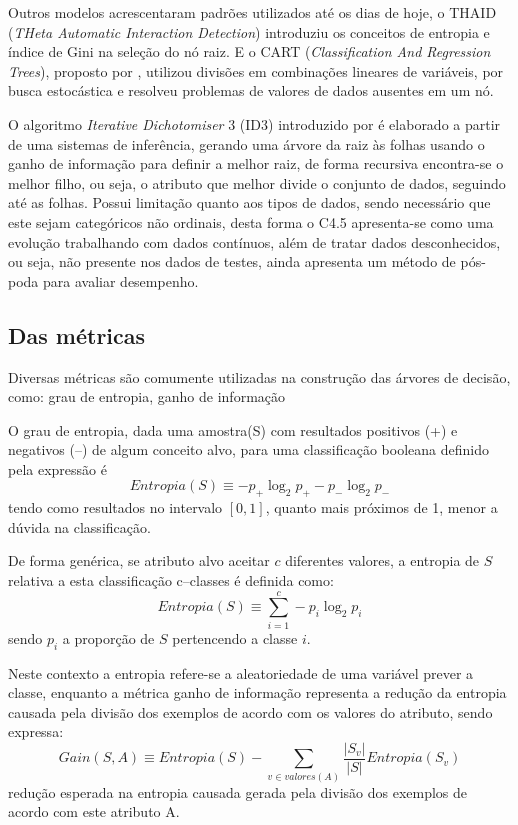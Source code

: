 \documentclass{article}
\begin{document}
Outros modelos acrescentaram padrões utilizados até os dias de hoje, o THAID (\emph{THeta Automatic Interaction Detection}) \cite{Messenger1972} introduziu os conceitos de entropia e índice de Gini na seleção do nó raiz. E o CART (\emph{Classification And Regression Trees}), proposto por \cite{Breiman1984}, utilizou divisões em combinações lineares de variáveis, por busca estocástica e resolveu problemas de valores de dados ausentes em um nó.

O algoritmo  \textit{Iterative Dichotomiser} 3 (ID3) introduzido  por  \cite{quinlan1986} é elaborado a partir de uma sistemas de inferência, gerando uma árvore da raiz às folhas usando o ganho de informação para definir a melhor raiz, de forma recursiva encontra-se o melhor filho, ou seja, o atributo que melhor divide o conjunto de dados, seguindo até as folhas. Possui limitação quanto aos tipos de dados, sendo necessário que este sejam categóricos não ordinais, desta forma o C4.5 apresenta-se como uma evolução trabalhando com dados contínuos, além de tratar dados desconhecidos, ou seja, não presente nos dados de testes, ainda apresenta um método de pós-poda para avaliar desempenho.

\subsection{Das métricas}

Diversas métricas são comumente utilizadas na construção das árvores de decisão, como: grau de entropia, ganho de informação

O grau de entropia, dada uma amostra(S) com resultados positivos (+) e negativos (–) de algum conceito alvo, para uma classificação booleana definido pela expressão é
\begin{equation}
    Entropia(S) \equiv -p_+ \log_2 p_+ - p_- \log_2 p_-
\end{equation}
tendo como resultados no intervalo $[0,1]$, quanto mais próximos de 1, menor a dúvida na classificação.

De forma genérica, se atributo alvo aceitar $c$ diferentes valores, a entropia de $S$ relativa a esta classificação c–classes é definida como:
\begin{equation}
    Entropia(S) \equiv \sum_{i=1}^{c} -p_i \log_2 p_i
\end{equation}
sendo $p_i$ a proporção de $S$ pertencendo a classe $i$.

Neste contexto a entropia refere-se a aleatoriedade de uma variável prever a classe,  enquanto a métrica ganho de informação representa a redução da entropia causada pela divisão dos exemplos de acordo com os valores do atributo, sendo expressa:
\begin{equation}
    Gain(S,A) \equiv Entropia(S) - \sum_{v \in valores(A)} \frac{|S_v|}{|S|} Entropia(S_v)
\end{equation}
redução esperada na entropia causada gerada pela divisão dos exemplos de acordo com este atributo A.
\end{document}
